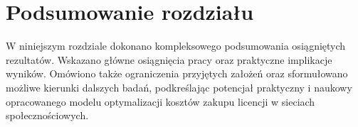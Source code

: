 \section{Podsumowanie rozdziału}

W niniejszym rozdziale dokonano kompleksowego podsumowania osiągniętych rezultatów. Wskazano główne osiągnięcia pracy oraz praktyczne implikacje wyników. Omówiono także ograniczenia przyjętych założeń oraz sformułowano możliwe kierunki dalszych badań, podkreślając potencjał praktyczny i naukowy opracowanego modelu optymalizacji kosztów zakupu licencji w sieciach społecznościowych.
